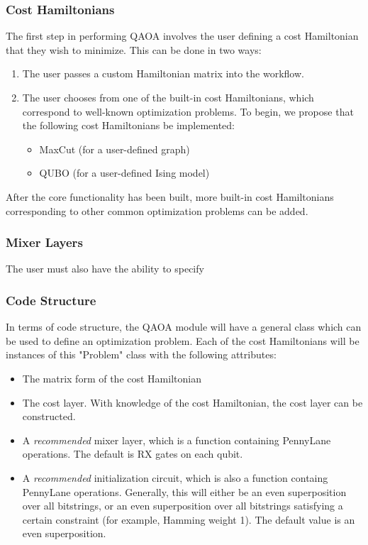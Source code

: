 \documentclass{article}
\begin{document}
\subsubsection{Cost Hamiltonians}

The first step in performing QAOA involves the user defining a cost Hamiltonian that 
they wish to minimize. This can be done in two ways:

\begin{enumerate}
	\item The user passes a custom Hamiltonian matrix into the workflow.
	\item The user chooses from one of the built-in cost Hamiltonians, which 
              correspond to well-known optimization problems. To begin, we propose 
   	      that the following cost Hamiltonians be implemented:
	      \begin{itemize}
		      \item MaxCut (for a user-defined graph)
		      \item QUBO (for a user-defined Ising model)
		\end{itemize}
\end{enumerate}
   
   After the core functionality has been built, more built-in cost Hamiltonians 
   corresponding to other common optimization problems can be added.

\subsubsection{Mixer Layers}

The user must also have the ability to specify

\subsubsection{Code Structure}

In terms of code structure, the QAOA module will have a general class which can 
be used to define an optimization problem. Each of the cost Hamiltonians will 
be instances of this "Problem" class with the following attributes:

   \begin{itemize}

	   \item The matrix form of the cost Hamiltonian
	   \item The cost layer. With knowledge of the cost Hamiltonian, the cost 
   		 layer can be constructed.
	   \item A \textit{recommended} mixer layer, which is a function containing
                 PennyLane operations. The default is RX gates on each qubit.
	   \item A \textit{recommended} initialization circuit, which is also a function 
                 containg PennyLane operations. Generally, this will either be an 
   		 even superposition over all bitstrings, or an even superposition over all 
   		 bitstrings satisfying a certain constraint (for example, Hamming weight 1).
   		 The default value is an even superposition.
   \end{itemize}
\end{document}

